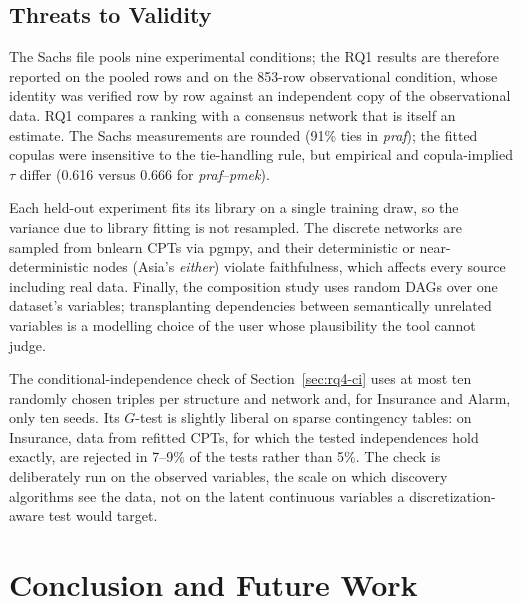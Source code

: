 \documentclass[
  english,
  class=report,
  accentcolor=2c,
  marginpar=false,
  parskip=half-,
  fontsize=11pt,
  ruledheaders=false,
  pdfa=false,
  IMRAD=false,
  thesis={type=master}
]{tudapub}
\begin{document}
\section{Threats to Validity}
The Sachs file pools nine experimental conditions; the RQ1 results are
therefore reported on the pooled rows and on the 853-row observational
condition, whose identity was verified row by row against an independent
copy of the observational data. RQ1 compares a ranking with a consensus network
that is itself an estimate. The Sachs measurements are rounded (91\% ties
in \emph{praf}); the fitted copulas were insensitive to the tie-handling
rule, but empirical and copula-implied $\tau$ differ (0.616 versus 0.666
for \emph{praf}--\emph{pmek}).

Each held-out experiment fits its library on a single training draw, so
the variance due to library fitting is not resampled. The discrete networks
are sampled from bnlearn CPTs via pgmpy, and their deterministic or
near-deterministic nodes (Asia's \emph{either}) violate faithfulness, which
affects every source including real data. Finally, the composition study
uses random DAGs over one dataset's variables; transplanting dependencies
between semantically unrelated variables is a modelling choice of the user
whose plausibility the tool cannot judge.

The conditional-independence check of Section~\ref{sec:rq4-ci} uses at most
ten randomly chosen triples per structure and network and, for Insurance and
Alarm, only ten seeds. Its $G$-test is slightly liberal on sparse
contingency tables: on Insurance, data from refitted CPTs, for which the
tested independences hold exactly, are rejected in 7--9\% of the tests
rather than 5\%. The check is deliberately run on the observed variables,
the scale on which discovery algorithms see the data, not on the latent
continuous variables a discretization-aware test
\parencite{sun2024} would target.

\chapter{Conclusion and Future Work}
\label{chap:conclusion}
\end{document}
